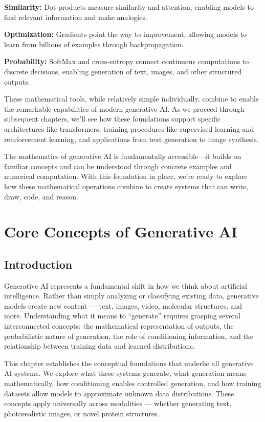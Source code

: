\documentclass{book}
\begin{document}
\textbf{Similarity:} Dot products measure similarity and attention, enabling models to find relevant information and make analogies.

\textbf{Optimization:} Gradients point the way to improvement, allowing models to learn from billions of examples through backpropagation.

\textbf{Probability:} SoftMax and cross-entropy connect continuous computations to discrete decisions, enabling generation of text, images, and other structured outputs.

These mathematical tools, while relatively simple individually, combine to enable the remarkable capabilities of modern generative AI. As we proceed through subsequent chapters, we'll see how these foundations support specific architectures like transformers, training procedures like supervised learning and reinforcement learning, and applications from text generation to image synthesis.

The mathematics of generative AI is fundamentally accessible—it builds on familiar concepts and can be understood through concrete examples and numerical computation. With this foundation in place, we're ready to explore how these mathematical operations combine to create systems that can write, draw, code, and reason.

\chapter{Core Concepts of Generative AI}

\section{Introduction}

Generative AI represents a fundamental shift in how we think about artificial
intelligence. Rather than simply analyzing or classifying existing data,
generative models create new content --- text, images, video, molecular
structures, and more. Understanding what it means to ``generate'' requires
grasping several interconnected concepts: the mathematical representation of
outputs, the probabilistic nature of generation, the role of conditioning
information, and the relationship between training data and learned
distributions.

This chapter establishes the conceptual foundations that underlie all generative
AI systems. We explore what these systems generate, what generation means
mathematically, how conditioning enables controlled generation, and how training
datasets allow models to approximate unknown data distributions. These concepts
apply universally across modalities --- whether generating text, photorealistic
images, or novel protein structures.
\end{document}

